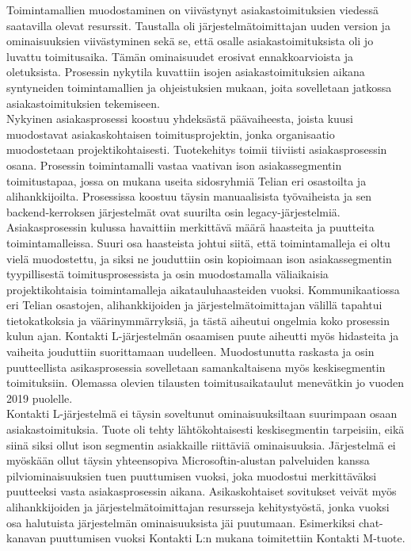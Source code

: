 \documentclass[finnish,12pt,a4paper,pdftex]{article}
\begin{document}
Toimintamallien muodostaminen on viivästynyt asiakastoimituksien viedessä saatavilla olevat resurssit. Taustalla oli järjestelmätoimittajan uuden version ja ominaisuuksien viivästyminen sekä se, että osalle asiakastoimituksista oli jo luvattu toimitusaika. Tämän ominaisuudet erosivat ennakkoarvioista ja oletuksista. Prosessin nykytila kuvattiin isojen asiakastoimituksien aikana syntyneiden toimintamallien ja ohjeistuksien mukaan, joita sovelletaan jatkossa asiakastoimituksien tekemiseen.\\

Nykyinen asiakasprosessi koostuu yhdeksästä päävaiheesta, joista kuusi muodostavat asiakaskohtaisen toimitusprojektin, jonka organisaatio muodostetaan projektikohtaisesti. Tuotekehitys toimii tiiviisti asiakasprosessin osana. Prosessin toimintamalli vastaa vaativan ison asiakassegmentin toimitustapaa, jossa on mukana useita sidosryhmiä Telian eri osastoilta ja alihankkijoilta. Prosessissa koostuu täysin manuaalisista työvaiheista ja sen backend-kerroksen järjestelmät ovat suurilta osin legacy-järjestelmiä. \\

Asiakasprosessin kulussa havaittiin merkittävä määrä haasteita ja puutteita toimintamalleissa. Suuri osa haasteista johtui siitä, että toimintamalleja ei oltu vielä muodostettu, ja siksi ne jouduttiin osin kopioimaan ison asiakassegmentin tyypillisestä toimitusprosessista ja osin muodostamalla väliaikaisia projektikohtaisia toimintamalleja aikatauluhaasteiden vuoksi. Kommunikaatiossa eri Telian osastojen, alihankkijoiden ja järjestelmätoimittajan välillä tapahtui tietokatkoksia ja väärinymmärryksiä, ja tästä aiheutui ongelmia koko prosessin kulun ajan. Kontakti L-järjestelmän osaamisen puute aiheutti myös hidasteita ja vaiheita jouduttiin suorittamaan uudelleen. Muodostunutta raskasta ja osin puutteellista asikasprosessia sovelletaan samankaltaisena myös keskisegmentin toimituksiin. Olemassa olevien tilausten toimitusaikataulut menevätkin jo vuoden 2019 puolelle.\\

Kontakti L-järjestelmä ei täysin soveltunut ominaisuuksiltaan suurimpaan osaan asiakastoimituksia. Tuote oli tehty lähtökohtaisesti keskisegmentin tarpeisiin, eikä siinä siksi ollut ison segmentin asiakkaille riittäviä ominaisuuksia. Järjestelmä ei myöskään ollut täysin yhteensopiva Microsoftin-alustan palveluiden kanssa pilviominaisuuksien tuen puuttumisen vuoksi, joka muodostui merkittäväksi puutteeksi vasta asiakasprosessin aikana. Asikaskohtaiset sovitukset veivät myös alihankkijoiden ja järjestelmätoimittajan resursseja kehitystyöstä, jonka vuoksi osa halutuista järjestelmän ominaisuuksista jäi puutumaan. Esimerkiksi chat-kanavan puuttumisen vuoksi Kontakti L:n mukana toimitettiin Kontakti M-tuote.\\
\end{document}
